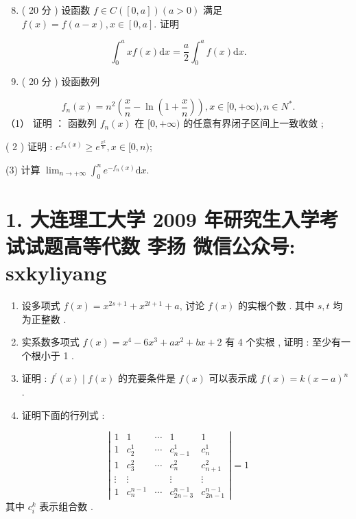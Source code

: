 \documentclass[10pt]{article}
\begin{document}
{\begin{enumerate}
  \setcounter{enumi}{7}
  \item ( 20  分 )  设函数  $f \in C([0, a])(a>0)$  满足  $f(x)=f(a-x), x \in[0, a]$.  证明 
\end{enumerate}
$$
\int_{0}^{a} x f(x) \mathrm{d} x=\frac{a}{2} \int_{0}^{a} f(x) \mathrm{d} x .
$$

\begin{enumerate}
  \setcounter{enumi}{8}
  \item ( 20  分 )  设函数列 
\end{enumerate}
$$
f_{n}(x)=n^{2}\left(\frac{x}{n}-\ln \left(1+\frac{x}{n}\right)\right), x \in[0,+\infty), n \in N^{*} .
$$
（1）  证明 ： 函数列  $f_{n}(x)$  在  $[0,+\infty)$  的任意有界闭子区间上一致收敛 ;

( 2 )  证明 : $e^{f_{n}(x)} \geqslant e^{\frac{x^{2}}{8}}, x \in[0, n)$;

(3)  计算  $\lim _{n \rightarrow+\infty} \int_{0}^{n} e^{-f_{n}(x)} \mathrm{d} x$.

\section{1. 大连理工大学 2009 年研究生入学考试试题高等代数 
 李扬 
 微信公众号: sxkyliyang}
\begin{enumerate}
  \item  设多项式  $f(x)=x^{2 s+1}+x^{2 t+1}+a$,  讨论  $f(x)$  的实根个数 .  其中  $s, t$  均为正整数 .

  \item  实系数多项式  $f(x)=x^{4}-6 x^{3}+a x^{2}+b x+2$  有  4  个实根 ,  证明 :  至少有一个根小于  1 .

  \item  证明 : $f^{\prime}(x) \mid f(x)$  的充要条件是  $f(x)$  可以表示成  $f(x)=k(x-a)^{n}$.

  \item  证明下面的行列式 :

\end{enumerate}
$$
\left|\begin{array}{ccccc}
1 & 1 & \cdots & 1 & 1 \\
1 & c_{2}^{1} & \cdots & c_{n-1}^{1} & c_{n}^{1} \\
1 & c_{3}^{2} & \cdots & c_{n}^{2} & c_{n+1}^{2} \\
\vdots & \vdots & & \vdots & \vdots \\
1 & c_{n}^{n-1} & \cdots & c_{2 n-3}^{n-1} & c_{2 n-1}^{n-1}
\end{array}\right|=1
$$
 其中  $c_{i}^{k}$  表示组合数 .

}
\end{document}
